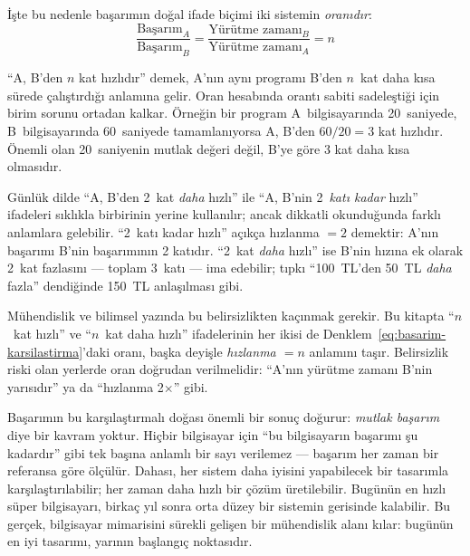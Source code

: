 İşte bu nedenle başarımın doğal ifade biçimi iki sistemin \emph{oranıdır}:
\begin{equation}
\frac{\text{Başarım}_A}{\text{Başarım}_B} = \frac{\text{Yürütme zamanı}_B}{\text{Yürütme zamanı}_A} = n
\label{eq:basarim-karsilastirma}
\end{equation}

\noindent ``A, B'den $n$ kat hızlıdır'' demek, A'nın aynı programı B'den $n$~kat daha kısa sürede çalıştırdığı anlamına gelir. Oran hesabında orantı sabiti sadeleştiği için birim sorunu ortadan kalkar. Örneğin bir program A~bilgisayarında 20~saniyede, B~bilgisayarında 60~saniyede tamamlanıyorsa A, B'den $60/20 = 3$ kat hızlıdır. Önemli olan 20~saniyenin mutlak değeri değil, B'ye göre 3 kat daha kısa olmasıdır.

\begin{bilginot}
Günlük dilde ``A, B'den 2~kat \emph{daha} hızlı'' ile ``A, B'nin 2~\emph{katı kadar} hızlı'' ifadeleri sıklıkla birbirinin yerine kullanılır; ancak dikkatli okunduğunda farklı anlamlara gelebilir. ``2~katı kadar hızlı'' açıkça hızlanma $= 2$ demektir: A'nın başarımı B'nin başarımının 2 katıdır. ``2~kat \emph{daha} hızlı'' ise B'nin hızına ek olarak 2~kat fazlasını --- toplam 3~katı --- ima edebilir; tıpkı ``100~TL'den 50~TL \emph{daha} fazla'' dendiğinde 150~TL anlaşılması gibi.

Mühendislik ve bilimsel yazında bu belirsizlikten kaçınmak gerekir. Bu kitapta ``$n$~kat hızlı'' ve ``$n$~kat daha hızlı'' ifadelerinin her ikisi de Denklem~\ref{eq:basarim-karsilastirma}'daki oranı, başka deyişle \emph{hızlanma $= n$} anlamını taşır. Belirsizlik riski olan yerlerde oran doğrudan verilmelidir: ``A'nın yürütme zamanı B'nin yarısıdır'' ya da ``hızlanma 2$\times$'' gibi.
\end{bilginot}

Başarımın bu karşılaştırmalı doğası önemli bir sonuç doğurur: \emph{mutlak başarım} diye bir kavram yoktur. Hiçbir bilgisayar için ``bu bilgisayarın başarımı şu kadardır'' gibi tek başına anlamlı bir sayı verilemez --- başarım her zaman bir referansa göre ölçülür. Dahası, her sistem daha iyisini yapabilecek bir tasarımla karşılaştırılabilir; her zaman daha hızlı bir çözüm üretilebilir. Bugünün en hızlı süper bilgisayarı, birkaç yıl sonra orta düzey bir sistemin gerisinde kalabilir. Bu gerçek, bilgisayar mimarisini sürekli gelişen bir mühendislik alanı kılar: bugünün en iyi tasarımı, yarının başlangıç noktasıdır.

